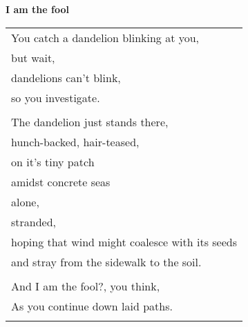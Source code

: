 \documentclass{article}
\begin{document}
\begin{center}
\textbf{I am the fool}\\
\begin{tabular}{l}
\\
You catch a dandelion blinking at you, \\
but wait, \\
dandelions can't blink, \\ %
so you investigate. \\
\\
The dandelion just stands there, \\
hunch-backed, hair-teased, \\
on it's tiny patch \\
amidst concrete seas \\
\hspace*{2em}alone, \\
\hspace*{4em}stranded, \\
hoping that wind might coalesce with its seeds \\
and stray from the sidewalk to the soil. \\
\\
And I am the fool?, you think, \\
As you continue down laid paths. \\
\\
%
%
%
\end{tabular}
\end{center}
\end{document}
